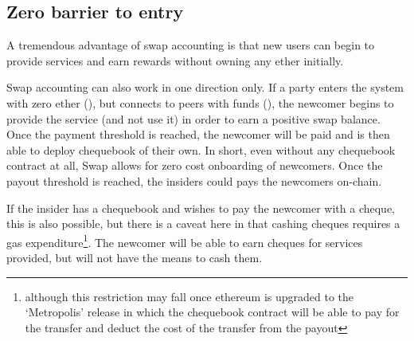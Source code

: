 
\subsection{Zero barrier to entry}

A tremendous advantage of swap accounting is that new users can begin to provide services and earn rewards without owning any ether initially.

Swap accounting can also work in one direction only. If a party enters the system with zero ether (), but connects to peers with funds (), the newcomer begins to provide the service (and not use it)
in order to earn a positive swap balance. Once the payment threshold is reached, the newcomer will be paid and is then able to deploy chequebook of their own.
In short, even without any chequebook contract at all, Swap allows for zero cost onboarding of newcomers. Once the payout threshold is reached, the insiders could pays the newcomers on-chain. 

If the insider has a chequebook and wishes to pay the newcomer with a cheque, this is also possible, but there is a caveat here in that cashing cheques requires a gas expenditure\footnote{although this restriction may fall once ethereum is upgraded to the `Metropolis' release in which the chequebook contract will be able to pay for the transfer and deduct the cost of the transfer from the payout}. The newcomer will be able to earn cheques for services provided, but will not have the means to cash them. 

